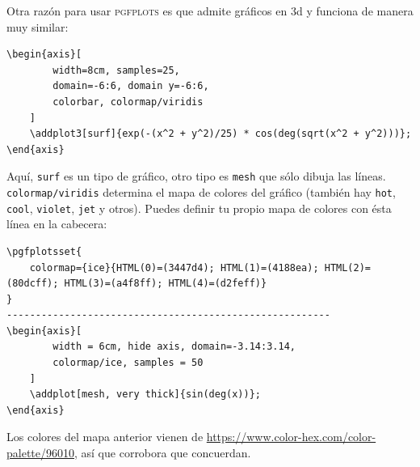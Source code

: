 \documentclass[intro-breve-latex.tex]{subfiles}
\begin{document}
Otra razón para usar \textsc{pgfplots} es que admite gráficos en 3d y funciona de manera muy similar:
\begin{lstlisting}
\begin{axis}[
		width=8cm, samples=25,
		domain=-6:6, domain y=-6:6,
		colorbar, colormap/viridis
	]
	\addplot3[surf]{exp(-(x^2 + y^2)/25) * cos(deg(sqrt(x^2 + y^2)))};
\end{axis}
\end{lstlisting}
\begin{figure}[!h]
	\centering
\end{figure}

Aquí, \texttt{surf} es un tipo de gráfico, otro tipo es \texttt{mesh} que sólo dibuja las líneas.
\texttt{colormap/viridis} determina el mapa de colores del gráfico (también hay \texttt{hot}, \texttt{cool}, \texttt{violet}, \texttt{jet} y otros).
Puedes definir tu propio mapa de colores con ésta línea en la cabecera:\pagebreak
\begin{lstlisting}
\pgfplotsset{
	colormap={ice}{HTML(0)=(3447d4); HTML(1)=(4188ea); HTML(2)=(80dcff); HTML(3)=(a4f8ff); HTML(4)=(d2feff)}
}
--------------------------------------------------------
\begin{axis}[
		width = 6cm, hide axis, domain=-3.14:3.14,
		colormap/ice, samples = 50
	]
	\addplot[mesh, very thick]{sin(deg(x))};
\end{axis}
\end{lstlisting}
\begin{figure}[!h]
	\centering
\end{figure}

Los colores del mapa anterior vienen de \url{https://www.color-hex.com/color-palette/96010}, así que corrobora que concuerdan.
\end{document}
